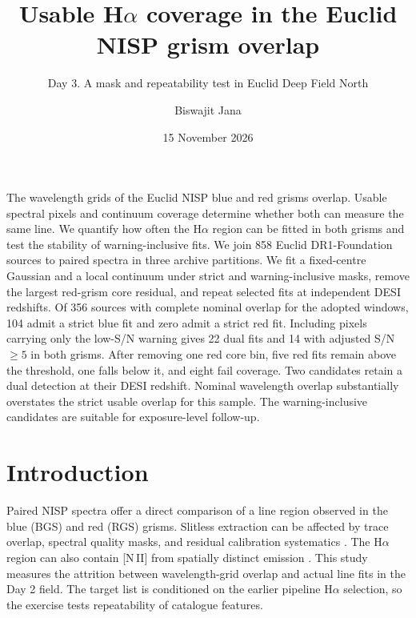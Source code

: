 \documentclass{aa}
\begin{document}
\title{Usable H$\alpha$ coverage in the Euclid NISP grism overlap}
\subtitle{Day 3. A mask and repeatability test in Euclid Deep Field North}
\author{Biswajit Jana}
\date{15 November 2026}
\abstract
{The wavelength grids of the Euclid NISP blue and red grisms overlap. Usable spectral pixels and continuum coverage determine whether both can measure the same line.}
{We quantify how often the H$\alpha$ region can be fitted in both grisms and test the stability of warning-inclusive fits.}
{We join 858 Euclid DR1-Foundation sources to paired spectra in three archive partitions. We fit a fixed-centre Gaussian and a local continuum under strict and warning-inclusive masks, remove the largest red-grism core residual, and repeat selected fits at independent DESI redshifts.}
{Of 356 sources with complete nominal overlap for the adopted windows, 104 admit a strict blue fit and zero admit a strict red fit. Including pixels carrying only the low-S/N warning gives 22 dual fits and 14 with adjusted S/N $\geq5$ in both grisms. After removing one red core bin, five red fits remain above the threshold, one falls below it, and eight fail coverage. Two candidates retain a dual detection at their DESI redshift.}
{Nominal wavelength overlap substantially overstates the strict usable overlap for this sample. The warning-inclusive candidates are suitable for exposure-level follow-up.}
\maketitle
\section{Introduction}
Paired NISP spectra offer a direct comparison of a line region observed in the blue (BGS) and red (RGS) grisms. Slitless extraction can be affected by trace overlap, spectral quality masks, and residual calibration systematics \citep{copin2026,fumana2026}. The H$\alpha$ region can also contain [N\,II] from spatially distinct emission \citep{gabarra2026}. This study measures the attrition between wavelength-grid overlap and actual line fits in the Day 2 field. The target list is conditioned on the earlier pipeline H$\alpha$ selection, so the exercise tests repeatability of catalogue features.
\end{document}
